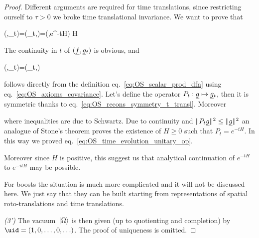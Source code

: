 \documentclass[../main/main.tex]{subfiles}
\begin{document}
\begin{proof}
	Different arguments are required for time translations, since restricting ourself to $\tau>0$ we broke time translational invariance. We want to prove that 
	\begin{eq}\label{eq:OS_time_evolution_unitary_op}
		(\uf,\ug_t)=(\uf_t,\ug)=(\uf,{e^{-tH}\ug})
		\twith 
		H 
	\end{eq}
	The continuity in $t$ of $(\uf,\ug_t)$ is obvious, and 
	\begin{eq}\label{eq:OS_recons_symmetry_t_transl}
		(\uf,\ug_t)=(\uf_t,\ug)
	\end{eq}
	follows directly from the definition eq.~\eqref{eq:OS_scalar_prod_dfn} using eq.~\eqref{eq:OS_axioms_covariance}. 
	Let's define the operator $P_t:\ug\mapsto\ug_t$, then it is symmetric thanks to eq.~\eqref{eq:OS_recons_symmetry_t_transl}. Moreover 
	\begin{eq}\end{eq}
	where inequalities are due to Schwartz. Due to continuity and $\norm{P_t\ug}^2\leq\norm\ug^2$ an analogue of Stone's theorem proves the existence of $H\geq0$ such that $P_t=e^{-tH}$. In this way we proved eq.~\eqref{eq:OS_time_evolution_unitary_op}.
	
	Moreover since $H$ is positive, this suggest us that analytical continuation of $e^{-tH}$ to $e^{-itH}$ may be possible.
	
	For boosts the situation is much more complicated and it will not be discussed here. We just say that they can be built starting from representations of spatial roto-translations and time translations.
	
	\textit{(3')} The vacuum $\,\vert\Omega\rangle$ is then given (up to quotienting and completion) by $\uid=(1,0,\ldots,0,\ldots)$. The proof of uniqueness is omitted.
	

\end{proof}
\end{document}
